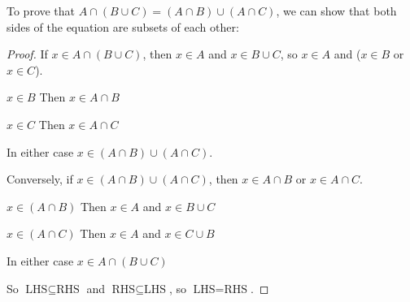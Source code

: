 \documentclass[../main.tex]{subfiles}
\begin{document}
To prove that $A \cap (B \cup C) = (A \cap B) \cup (A \cap C)$, we can show that both sides of the equation are subsets of each other:
\begin{proof}\par
  If $x \in A \cap (B \cup C)$, then $x \in A$ and $x \in B \cup C$, so $x \in A$ and ($x \in B$ or $x \in C$).
  \begin{proofcases}
    \begin{case}{$x \in B$}
      Then $x \in A \cap B$
    \end{case}
    \begin{case}{$x \in C$}
      Then $x \in A \cap C$
    \end{case}
  \end{proofcases}
  In either case $x \in (A \cap B) \cup (A \cap C)$.

  Conversely, if $x \in (A \cap B) \cup (A \cap C)$, then $x \in A \cap B$ or $x \in A \cap C$.
  \begin{proofcases}
    \begin{case}{$x \in (A \cap B)$}
      Then $x \in A$ and $x \in B \cup C$
    \end{case}
    \begin{case}{$x \in (A \cap C)$}
      Then $x \in A$ and $x \in C \cup B$
    \end{case}
  \end{proofcases}
  In either case $x \in A \cap (B \cup C)$

  So $\text{LHS} \subseteq \text{RHS}$ and $\text{RHS} \subseteq \text{LHS}$, so $\text{LHS} = \text{RHS}$.
\end{proof}
\end{document}
